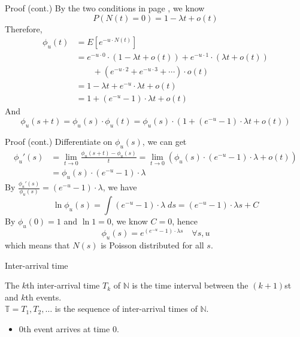 \documentclass[mathserif]{beamer}
\begin{document}
\begin{frame}{Proof (cont.)}
By the two conditions in page \pageref{operation_def}, we know
\[
P(N(t) = 0) = 1 - \lambda t + o(t)
\]
Therefore,
\begin{align*}
\phi_u(t) & = E[e^{-u\cdot N(t)}] \\
& = e^{-u\cdot 0}\cdot (1 - \lambda t + o(t)) + e^{-u\cdot 1}\cdot (\lambda t + o(t)) \\
& \qquad + (e^{-u\cdot 2} + e^{-u\cdot 3} + \cdots)\cdot o(t) \\
& = 1 - \lambda t + e^{-u} \cdot \lambda t + o(t) \\
& = 1 + (e^{-u} - 1)\cdot \lambda t + o(t)
\end{align*}
And
\[
\phi_u(s+t) = \phi_u(s)\cdot \phi_u(t) = \phi_u(s)\cdot (1 + (e^{-u} - 1)\cdot \lambda t + o(t))
\]
\end{frame}

\begin{frame}{Proof (cont.)}
Differentiate on $\phi_u(s)$, we can get
\begin{align*}
{\phi_u}'(s) & = \lim_{t\to 0}\frac{\phi_u(s+t) - \phi_u(s)}{t}
 = \lim_{t\to 0}(\phi_u(s)\cdot (e^{-u} - 1)\cdot \lambda + o(t)) \\
& = \phi_u(s)\cdot (e^{-u} - 1)\cdot \lambda
\end{align*}
By $\frac{{\phi_u}'(s)}{\phi_u(s)} = (e^{-u} - 1)\cdot \lambda$, we have
\[
\ln \phi_u(s) = \int (e^{-u} - 1)\cdot \lambda \; ds = (e^{-u} - 1)\cdot \lambda s + C
\]
By $\phi_u(0) = 1$ and $\ln 1 = 0$, we know $C = 0$, hence
\[
\phi_u(s) = e^{(e^{-u} - 1)\cdot \lambda s} \quad\forall s, u
\]
which means that $N(s)$ is Poisson distributed for all $s$.
\end{frame}

\begin{frame}{Inter-arrival time}
\begin{definition}
The $k$th inter-arrival time $T_k$ of $\mathbb{N}$ is the time interval between the $(k+1)$st and $k$th events.\\
$\mathbb{T} = T_1, T_2, \ldots$ is the sequence of inter-arrival times of $\mathbb{N}$.
\end{definition}
\begin{itemize}
\item $0$th event arrives at time $0$.
\end{itemize}
\end{frame}
\end{document}
